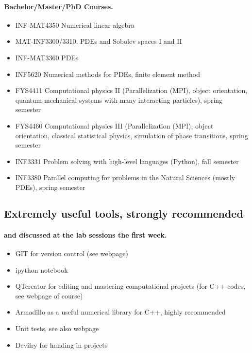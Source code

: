 \documentclass[%
oneside,                 %
final,                   %
10pt]{article}
\begin{document}
\paragraph{Bachelor/Master/PhD Courses.}
\begin{itemize}
  \item INF-MAT4350 Numerical linear algebra

  \item MAT-INF3300/3310, PDEs and Sobolev spaces I and II

  \item INF-MAT3360 PDEs

  \item INF5620 Numerical methods for PDEs, finite element method

  \item FYS4411 Computational physics II (Parallelization (MPI), object orientation, quantum mechanical systems with many interacting particles), spring semester

  \item FYS4460 Computational physics III (Parallelization (MPI), object orientation, classical statistical physics, simulation of phase transitions, spring semester

  \item INF3331 Problem solving with high-level languages (Python), fall semester

  \item INF3380 Parallel computing for problems in the Natural Sciences (mostly PDEs), spring semester
\end{itemize}

\noindent




\subsection{Extremely useful tools, strongly recommended}


\paragraph{and discussed at the lab sessions the first week.}
\begin{itemize}
  \item GIT for version control (see webpage)

  \item ipython notebook

  \item QTcreator for editing and mastering computational projects (for C++ codes, see webpage of course)

  \item Armadillo as a useful numerical library for C++, highly recommended

  \item Unit tests, see also webpage

  \item Devilry for handing in projects
\end{itemize}
\end{document}
